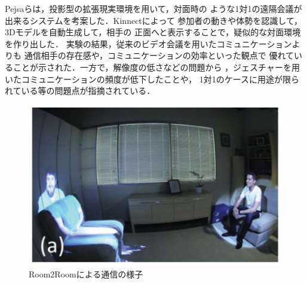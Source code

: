 Pejsaら\cite{27}は，投影型の拡張現実環境を用いて，対面時の
ような1対1の遠隔会議が出来るシステムを考案した．Kinnectによって
参加者の動きや体勢を認識して，3Dモデルを自動生成して，相手の
正面へと表示することで，疑似的な対面環境を作り出した．
実験の結果，従来のビデオ会議を用いたコミュニケーションよりも
通信相手の存在感や，コミュニケーションの効率といった観点で
優れていることが示された．一方で，解像度の低さなどの問題から
，ジェスチャーを用いたコミュニケーションの頻度が低下したことや，
1対1のケースに用途が限られている等の問題点が指摘されている．
\begin{figure}[tp]
  \centering
  \includegraphics[scale=1.2]{fig/2room2.png}
  \caption{Room2Roomによる通信の様子\cite{27}}
\end{figure}

